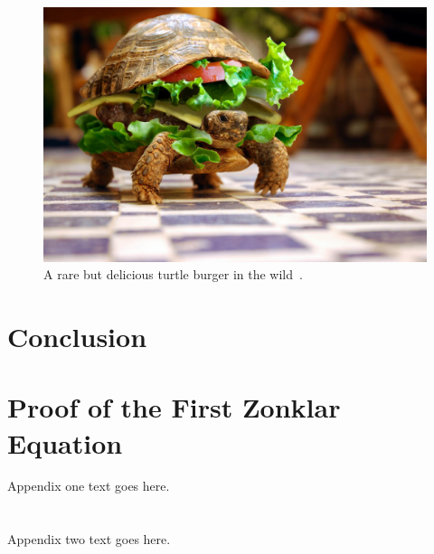\documentclass[a4paper, 10pt, american, titlepage]{article}
\begin{document}
\begin{figure}[h]
	\centering
	\includegraphics[width=\textwidth]{turtle-burger.jpg}
	\caption[A rare but delicious turtle burger in the wild]{A rare but
		delicious turtle burger in the wild~\autocite{harvey2002}.}
	\label{fig:turtleBurger}
\end{figure}

\section{Conclusion}
\label{sec:conclusion}

\clearpage %

\printbibliography
{}

\newpage

\appendices
\section{Proof of the First Zonklar Equation}
Appendix one text goes here.

\section{}
Appendix two text goes here.
\end{document}
